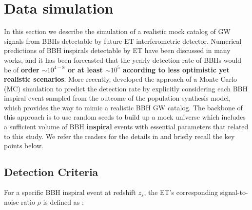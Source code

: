 \documentclass[twocolumn]{aastex62}
\begin{document}
\vspace{1cm}
\section{Data simulation} \label{sec_simulation}
In this section we describe the simulation of a realistic mock catalog of GW signals from BBHs detectable by future ET interferometric detector. Numerical predictions of BBH inspirals detectable by ET 
have been discussed in many works, and it has been forecasted that the yearly detection rate of BBHs would be of \textbf{order $\sim10^{4-8}$ \citep{Abernathy2011} or at least $\sim10^{5}$ according to less optimistic yet realistic scenarios\citep{Ola2013, Biesiada2014}}. More recently, \citet{Yang2019} developed the approach of a Monte Carlo (MC) simulation to predict the detection rate by explicitly considering each BBH inspiral event sampled from the outcome of the population synthesis model, which provides the way to mimic a realistic BBH GW catalog. The backbone of this approach is to use random seeds to build up a mock universe which includes a sufficient volume of BBH \textbf{inspiral} events with essential parameters that related to this study. We refer the readers for the details in \citet[][Section 2, therein]{Yang2019}  and briefly recall the key points below.

\subsection{Detection Criteria} \label{subsec_criteria}
For a specific BBH inspiral event at redshift $z_s$, the ET's corresponding signal-to-noise ratio $\rho$ is defined as \citep{Abernathy2011}:
\end{document}
